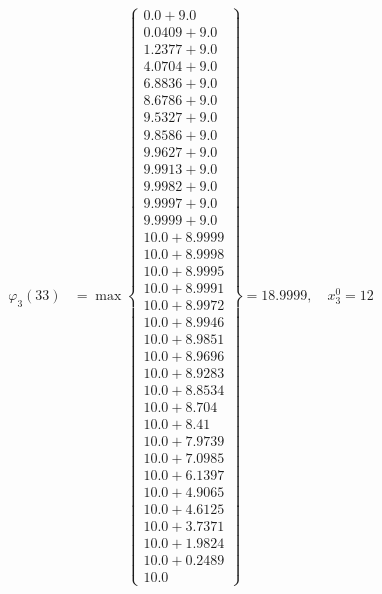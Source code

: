 \documentclass{article}
\begin{document}
\begin{align*}
  
\varphi_{3}(33) &= \max \left\{ \begin{array}{c}
0.0 + 9.0 \\
 0.0409 + 9.0 \\
 1.2377 + 9.0 \\
 4.0704 + 9.0 \\
 6.8836 + 9.0 \\
 8.6786 + 9.0 \\
 9.5327 + 9.0 \\
 9.8586 + 9.0 \\
 9.9627 + 9.0 \\
 9.9913 + 9.0 \\
 9.9982 + 9.0 \\
 9.9997 + 9.0 \\
 9.9999 + 9.0 \\
 10.0 + 8.9999 \\
 10.0 + 8.9998 \\
 10.0 + 8.9995 \\
 10.0 + 8.9991 \\
 10.0 + 8.9972 \\
 10.0 + 8.9946 \\
 10.0 + 8.9851 \\
 10.0 + 8.9696 \\
 10.0 + 8.9283 \\
 10.0 + 8.8534 \\
 10.0 + 8.704 \\
 10.0 + 8.41 \\
 10.0 + 7.9739 \\
 10.0 + 7.0985 \\
 10.0 + 6.1397 \\
 10.0 + 4.9065 \\
 10.0 + 4.6125 \\
 10.0 + 3.7371 \\
 10.0 + 1.9824 \\
 10.0 + 0.2489 \\
 10.0
\end{array} \right\}=18.9999,\quad x_{3}^0=12\\
  
  
  

\end{align*}
\end{document}

